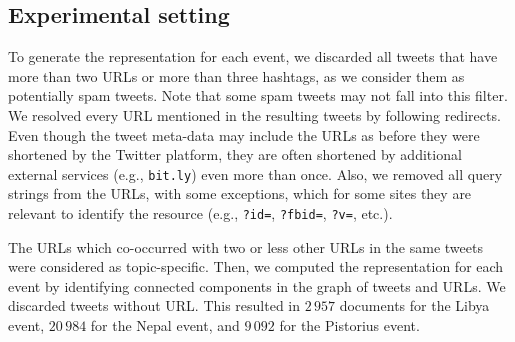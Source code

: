 







\subsection{Experimental setting}

To generate the representation for each event, we discarded all tweets that have
more than two URLs or more than three hashtags, as we consider them as
potentially spam tweets. 
%
Note that some spam tweets may not fall into this filter.
%
We resolved every URL mentioned in the resulting tweets by following redirects. 
%
Even though the tweet meta-data may include the URLs as before they were
shortened by the Twitter platform, they are often shortened by additional
external services (e.g., {\tt bit.ly}) even more than once.
%
Also, we removed all query strings from the URLs, with some exceptions, which
for some sites they are relevant to identify the resource (e.g., {\tt ?id=},
{\tt ?fbid=}, {\tt ?v=}, etc.).


The URLs which co-occurred with two or less other URLs in the same tweets were
considered as topic-specific.
%
Then, we computed the representation for each event by identifying connected
components in the graph of tweets and URLs. We discarded tweets without URL.
%
This resulted in $2\,957$ documents for the Libya event, $20\,984$ for the Nepal
event, and $9\,092$ for the Pistorius event.

